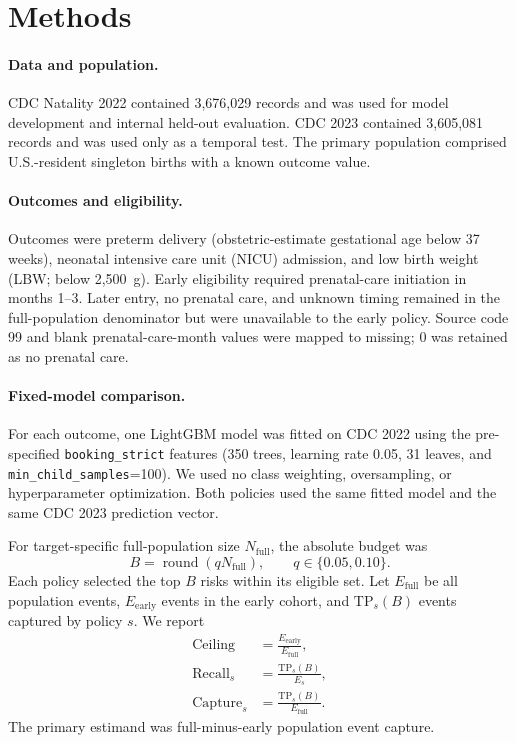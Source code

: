 \documentclass[pmlr,twocolumn,10pt]{jmlr}
\begin{document}
\section{Methods}
\label{sec:methods}

\paragraph{Data and population.}
CDC Natality 2022 contained 3,676,029 records and was used for model
development and internal held-out evaluation. CDC 2023 contained 3,605,081
records and was used only as a temporal test. The primary population comprised
U.S.-resident singleton births with a known outcome value.

\paragraph{Outcomes and eligibility.}
Outcomes were preterm delivery (obstetric-estimate gestational age below 37
weeks), neonatal intensive care unit (NICU) admission, and low birth weight
(LBW; below 2,500~g). Early eligibility required prenatal-care initiation in
months 1--3. Later entry, no prenatal care, and unknown timing remained in the
full-population denominator but were unavailable to the early policy. Source
code 99 and blank prenatal-care-month values were mapped to missing; 0 was
retained as no prenatal care.

\paragraph{Fixed-model comparison.}
For each outcome, one LightGBM model was fitted on CDC 2022 using the
pre-specified \texttt{booking\_strict} features (350 trees, learning rate
0.05, 31 leaves, and \texttt{min\_child\_samples}=100). We used no class
weighting, oversampling, or hyperparameter optimization. Both policies used
the same fitted model and the same CDC 2023 prediction vector.

For target-specific full-population size $N_{\mathrm{full}}$, the absolute
budget was
\[
B=\operatorname{round}(qN_{\mathrm{full}}),
\qquad q\in\{0.05,0.10\}.
\]
Each policy selected the top $B$ risks within its eligible set. Let
$E_{\mathrm{full}}$ be all population events, $E_{\mathrm{early}}$ events in
the early cohort, and $\mathrm{TP}_{s}(B)$ events captured by policy $s$. We
report
\begin{align*}
\mathrm{Ceiling} &= \frac{E_{\mathrm{early}}}{E_{\mathrm{full}}},\\
\mathrm{Recall}_{s} &= \frac{\mathrm{TP}_{s}(B)}{E_s},\\
\mathrm{Capture}_{s} &= \frac{\mathrm{TP}_{s}(B)}{E_{\mathrm{full}}}.
\end{align*}
The primary estimand was full-minus-early population event capture.
\end{document}

